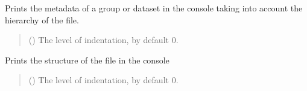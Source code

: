 \documentclass[letterpaper,10pt,english]{sphinxmanual}
\begin{document}
\begin{fulllineitems}
\begin{fulllineitems}
\begin{quote}
\begin{description}
\begin{itemize}
\end{itemize}

\end{description}\end{quote}

\end{fulllineitems}


\begin{fulllineitems}
\label{\detokenize{source/_autosummary/HDF5_BLS.Wrapper:HDF5_BLS.Wrapper.print_metadata}}
\pysigstartsignatures
\pysiglinewithargsret
{}
{}
{}
\pysigstopsignatures
\sphinxAtStartPar
Prints the metadata of a group or dataset in the console taking into account the hierarchy of the file.
\begin{quote}\begin{description}
\sphinxAtStartPar
{} (\sphinxstyleliteralemphasis{\sphinxupquote{, }}) \textendash{} The level of indentation, by default 0.

\end{description}\end{quote}

\end{fulllineitems}


\begin{fulllineitems}
\label{\detokenize{source/_autosummary/HDF5_BLS.Wrapper:HDF5_BLS.Wrapper.print_structure}}
\pysigstartsignatures
\pysiglinewithargsret
{}
{}
{}
\pysigstopsignatures
\sphinxAtStartPar
Prints the structure of the file in the console
\begin{quote}\begin{description}
\sphinxAtStartPar
{} (\sphinxstyleliteralemphasis{\sphinxupquote{, }}) \textendash{} The level of indentation, by default 0.


\end{description}
\end{quote}
\end{fulllineitems}
\end{fulllineitems}
\end{document}
